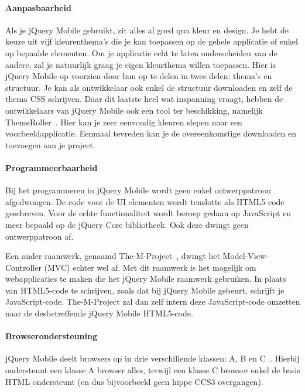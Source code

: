 \paragraph{Aanpasbaarheid}
Als je jQuery Mobile  gebruikt, zit alles al goed qua kleur en design. 
Je hebt de keuze uit vijf kleurenthema's die je kan toepassen op de gehele applicatie of enkel op bepaalde elementen. 
Om je applicatie echt te laten onderscheiden van de andere, zal je natuurlijk graag je eigen kleurthema willen toepassen. 
Hier is jQuery Mobile op voorzien door hun  op te delen in twee delen: thema's en structuur. 
Je kan als ontwikkelaar ook enkel de structuur downloaden en zelf de thema CSS schrijven. 
Daar dit laatste heel wat inspanning vraagt, hebben de ontwikkelaars van jQuery Mobile ook een tool ter beschikking,  namelijk ThemeRoller~\cite{JQuery2012c}. 
Hier kan je zeer eenvoudig kleuren slepen naar een voorbeeldapplicatie. 
Eenmaal tevreden kan je de overeenkomstige  downloaden en toevoegen aan je project.

\paragraph{Programmeerbaarheid}
Bij het programmeren in jQuery Mobile wordt geen enkel ontwerppatroon afgedwongen. 
De code voor de UI elementen wordt tenslotte als HTML5 code geschreven. 
Voor de echte functionaliteit wordt beroep gedaan op JavaScript en meer bepaald op de jQuery Core bibliotheek. 
Ook deze dwingt geen ontwerppatroon af.

Een ander raamwerk, genaamd The-M-Project~\cite{Panacoda2012}, dwingt het Model-View-Controller (MVC) echter wel af. 
Met dit raamwerk is het mogelijk om webapplicaties te maken die het jQuery Mobile raamwerk gebruiken. 
In plaats van HTML5-code te schrijven, zoals dat bij jQuery Mobile gebeurt, schrijft je JavaScript-code. 
The-M-Project zal dan zelf intern deze JavaScript-code omzetten naar de desbetreffende jQuery Mobile HTML5-code.

\paragraph{Browserondersteuning}
\label{sec:jqm-browser-support}
jQuery Mobile deelt browsers op in drie verschillende klassen: A, B en C~\cite{JQuery2012d}. 
Hierbij ondersteunt een klasse A browser alles, terwijl een klasse C browser enkel de basis HTML ondersteunt (en dus bijvoorbeeld geen hippe CCS3 overgangen).

